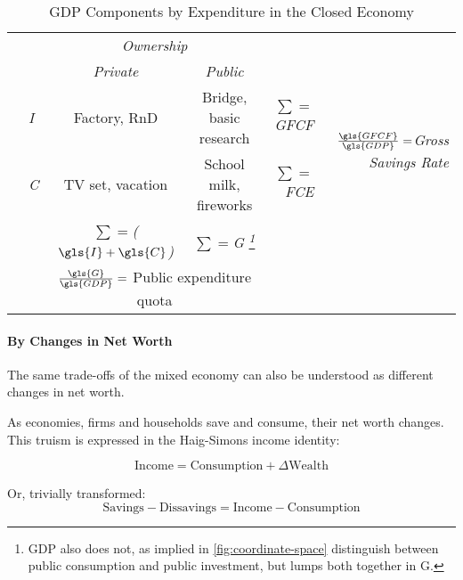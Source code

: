 \begin{landscape}%
\begin{table}
	\caption{GDP Components by Expenditure in the Closed Economy}
	\label{tab:GDP-Comp-Exp}
	\small
	\begin{center}
	\renewcommand{\arraystretch}{1.5}
	\begin{tabular}{llccrr}
		\toprule
		& & \multicolumn{2}{c}{\emph{Ownership}} & &\\
		\cmidrule(r){3-4}
		& &\emph{Private} & \emph{Public}& &\\
		\midrule
		\multirow{2}{*}{\emph{}} & \emph{\gls{I}} & Factory,  \gls{RnD} & Bridge, basic research & \emph{$\sum=$\gls{GFCF}} & \multirow{2}{*}{\emph{$\frac{\gls{GFCF}}{\gls{GDP}}=$Gross Savings Rate}}\\
		& \emph{\gls{C}} & TV set, vacation & School milk, fireworks & \emph{$\sum=$\gls{FCE}}  \\
		\midrule
		& &\emph{$\sum=$($\gls{I}+\gls{C}$)} & \emph{$\sum=$\gls{G}
		\footnote{
			\Gls{GDP} also does not, as implied in \autoref{fig:coordinate-space} distinguish between public consumption and public investment, but lumps both together in \gls{G}.
		}}\\
		\cmidrule(r){3-4}
		& & \multicolumn{2}{c}{$\frac{\gls{G}}{\gls{GDP}}=$ Public expenditure quota} \\
		\bottomrule
	\end{tabular}
	\end{center}
\end{table}
\end{landscape}

\paragraph{By Changes in Net Worth}  \label{sec:delta-net-worth} The same trade-offs of the mixed economy can also be understood as different changes in net worth.

As economies, firms and households save and consume, their net worth changes.
This truism is expressed in the Haig-Simons income identity:

\begin{equation} \label{eq:haig-simons}
			\text{Income}=\text{Consumption}+\Delta\text{Wealth}
\end{equation}

Or, trivially transformed:
\begin{equation} \label{eq:haig-simons-trade-off}
			\text{Savings}-\text{Dissavings}=\text{Income}-\text{Consumption}
\end{equation}


